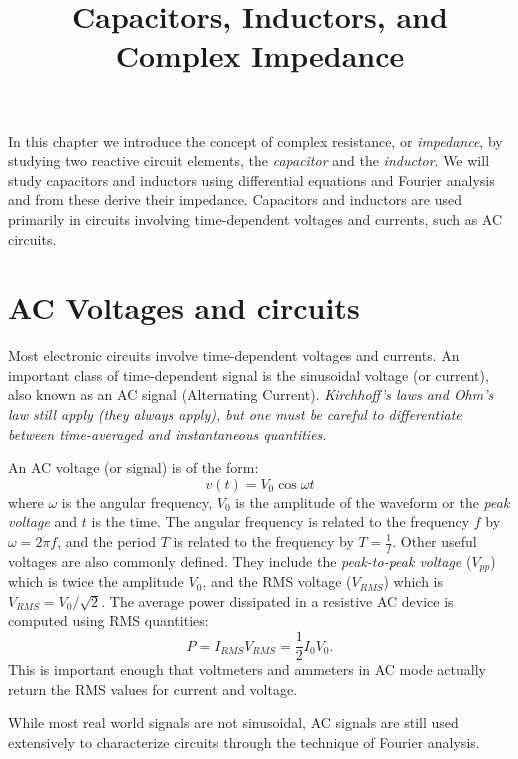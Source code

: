 \documentclass{article}
\title{Capacitors, Inductors, and Complex Impedance}
\begin{document}
\maketitle

In this chapter we introduce the concept of complex resistance, or \emph{impedance}, by studying two reactive circuit elements, the \emph{capacitor} and the \emph{inductor}. We will study capacitors and inductors using differential equations and Fourier analysis and from these derive their impedance. Capacitors and inductors are used primarily in circuits involving time-dependent voltages and currents, such as AC circuits.

\section{AC Voltages and circuits}
Most electronic circuits involve time-dependent voltages and currents. An important class of time-dependent signal is the sinusoidal voltage (or current), also known as an AC signal (Alternating Current). \emph{Kirchhoff's laws and Ohm's law still apply (they always apply), but one must be careful to differentiate between time-averaged and instantaneous quantities.}

An AC voltage (or signal) is of the form:
\begin{equation}
v(t) = V_0 \cos\omega t
\end{equation}
where $\omega$ is the angular frequency, $V_0$ is the amplitude of the waveform or the \emph{peak voltage} and $t$ is the time. The angular frequency is related to the frequency $f$ by $\omega = 2 \pi f$, and the period $T$ is related to the frequency by $T = \frac{1}{f}$. Other useful voltages are also commonly defined. They include the \emph{peak-to-peak voltage} ($V_{pp}$) which is twice the amplitude $V_0$, and the RMS voltage ($V_{RMS}$) which is $V_{RMS} = V_0 / \sqrt{2}$. The average power dissipated in a resistive AC device is computed using RMS quantities:
\begin{equation}
P = I_{RMS} V_{RMS} = \frac{1}{2} I_0 V_0.
\end{equation}
This is important enough that voltmeters and ammeters in AC mode actually return the RMS values for current and voltage.

While most real world signals are not sinusoidal, AC signals are still used extensively to characterize circuits through the technique of Fourier analysis.
\end{document}
